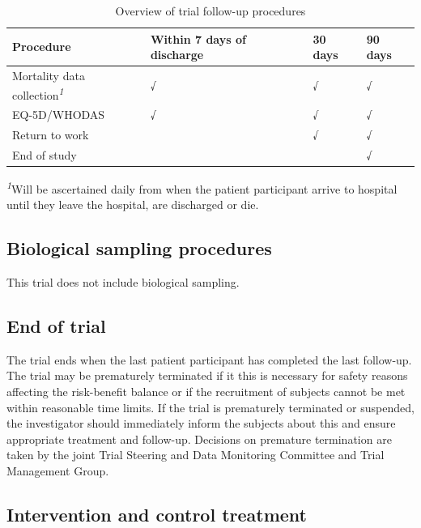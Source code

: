 \documentclass[
]{scrartcl}
\begin{document}
\hypertarget{tbl-procedures-followup}{}
\setlength{\LTpost}{0mm}
\begin{longtable}{llll}
\caption{\label{tbl-procedures-followup}Overview of trial follow-up procedures }\tabularnewline

\toprule
Procedure & Within 7 days of discharge & 30 days & 90 days \\ 
\midrule\addlinespace[2.5pt]
Mortality data collection\textsuperscript{\textit{1}} & √ & √ & √ \\ 
EQ-5D/WHODAS & √ & √ & √ \\ 
Return to work &  & √ & √ \\ 
End of study &  &  & √ \\ 
\bottomrule
\end{longtable}
\begin{minipage}{\linewidth}
\textsuperscript{\textit{1}}Will be ascertained daily from when the patient participant arrive to hospital until they leave the hospital, are discharged or die.\\
\end{minipage}

\endgroup

\hypertarget{biological-sampling-procedures}{%
\subsection{Biological sampling
procedures}\label{biological-sampling-procedures}}

This trial does not include biological sampling.

\hypertarget{end-of-trial}{%
\subsection{End of trial}\label{end-of-trial}}

The trial ends when the last patient participant has completed the last
follow-up. The trial may be prematurely terminated if it this is
necessary for safety reasons affecting the risk-benefit balance or if
the recruitment of subjects cannot be met within reasonable time limits.
If the trial is prematurely terminated or suspended, the investigator
should immediately inform the subjects about this and ensure appropriate
treatment and follow-up. Decisions on premature termination are taken by
the joint Trial Steering and Data Monitoring Committee and Trial
Management Group.

\hypertarget{intervention-and-control-treatment}{%
\subsection{Intervention and control
treatment}\label{intervention-and-control-treatment}}
\end{document}
